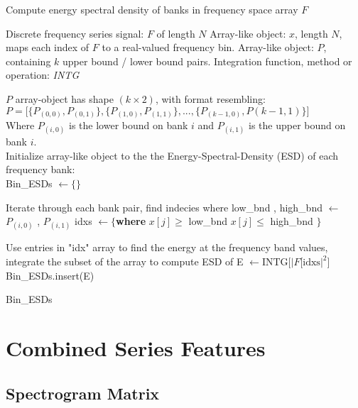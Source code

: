 \documentclass[12pt,letterpaper]{article}
\begin{document}
\begin{algorithm}
\label{ESD}
\caption{Compute energy spectral density of banks in frequency space array $F$}
\begin{algorithmic}
\REQUIRE Discrete frequency series signal: $F$ of length $N$
\REQUIRE Array-like object: $x$, length $N$, maps each index of $F$ to a real-valued frequency bin.
\REQUIRE Array-like object: $P$, containing $k$ upper bound / lower bound pairs.
\REQUIRE Integration function, method or operation: \textit{INTG}

\ENSURE $P$ array-object has shape $(k \times 2)$, with format resembling: \\
$P = \Big[ \{P_{(0,0)},P_{(0,1)}\} , \{P_{(1,0)},P_{(1 ,1)}\} ,  ... , \{P_{(k-1,0)},P{(k-1,1)}\} \Big]$\\
Where $P_{(i,0)}$ is the lower bound on bank $i$ and $P_{(i,1)}$ is the upper bound on bank $i$.\\
Initialize array-like object to the the Energy-Spectral-Density (ESD) of each frequency bank: \\
Bin\_ESDs $\leftarrow \{\}$

	\item Iterate through each bank pair, find indecies where  
	\STATE low\_bnd , high\_bnd $\leftarrow$ $P_{(i,0)}$ , $P_{(i,1)}$
	\STATE idxs $\leftarrow \{ $\textbf{where} $x[j] \geq$ low\_bnd \AND $x[j] \leq$ high\_bnd $\}$
	\item Use entries in "idx" array to find the energy at the frequency band values, integrate the subset of the array to compute ESD of 
	\STATE E $\leftarrow \text{INTG}\big[ |F[\text{idxs}|^2 \Big]$
	\STATE Bin\_ESDs.insert(E)
\ENDFOR

\RETURN Bin\_ESDs


\end{algorithmic}
\end{algorithm}




\section{Combined Series Features}


\subsection{Spectrogram Matrix}
\end{document}
